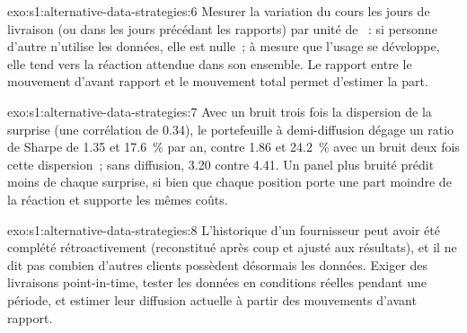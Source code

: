 \begin{solution}{exo:s1:alternative-data-strategies:6}
Mesurer la variation du cours les jours de livraison (ou dans les jours précédant les rapports) par unité de ~: si personne d'autre n'utilise les données, elle est nulle~; à mesure que l'usage
se développe, elle tend vers la réaction attendue dans son ensemble. Le rapport entre le mouvement d'avant rapport et le mouvement total permet d'estimer la part.
\end{solution}

\begin{solution}{exo:s1:alternative-data-strategies:7}
Avec un bruit trois fois la dispersion de la surprise (une corrélation de 0.34), le portefeuille à demi-diffusion dégage un ratio de Sharpe de 1.35 et 17.6~\% par an, contre 1.86 et 24.2~\% avec
un bruit deux fois cette dispersion~; sans diffusion, 3.20 contre 4.41. Un panel plus bruité prédit moins de chaque surprise, si bien que chaque position porte une part moindre de la réaction
et supporte les mêmes coûts.
\end{solution}

\begin{solution}{exo:s1:alternative-data-strategies:8}
L'historique d'un fournisseur peut avoir été complété rétroactivement (reconstitué après coup et ajusté aux résultats), et il ne dit pas combien d'autres clients possèdent désormais les
données. Exiger des livraisons point-in-time, tester les données en conditions réelles pendant une période, et estimer leur diffusion actuelle à partir des mouvements d'avant rapport.
\end{solution}

